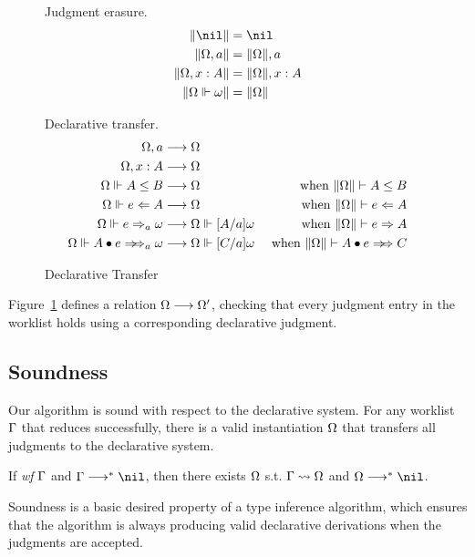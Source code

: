 \begin{figure}[ht]
\hfill \framebox{$\|\Om\|$} \hfill Judgment erasure.
\begin{gather*}
\begin{aligned}
\|\nil\| &= \nil\\
\|\Om,a\| &= \|\Om\|, a\\
\|\Om,x:A\| &= \|\Om\|, x:A\\
\|\Om\Vdash\jg\| &= \|\Om\|
\end{aligned}
\end{gather*}

\hfill {} \hfill Declarative transfer.
\begin{gather*}
\begin{aligned}
\Om,a &\rto \Om \\  \Om,x:A & \rto \Om\\
\Om\Vdash A\le B &\rto \Om &\text{ when } \|\Om\| \vdash A\le B\\
\Om\Vdash e\Lto A &\rto \Om & \text{ when } \|\Om\| \vdash e\Lto A\\
\Om\Vdash e\To_a \jg &\rto \Om\Vdash[A/a]\jg & \text{ when } \|\Om\| \vdash e\To A\\
\Om\Vdash \appInfAlg{A}{e} &\rto \Om\Vdash[C/a]\jg & \text{ when } \|\Om\| \vdash \appInf{A}{e}{C}\\
\end{aligned}
\end{gather*}
\caption{Declarative Transfer}
\label{fig:top:decl:worklist}
\end{figure}

Figure~\ref{fig:top:decl:worklist} defines a relation $\Omega \longrightarrow \Omega'$,
checking that every judgment entry in the worklist
holds using a corresponding declarative judgment.

\subsection{Soundness}

Our algorithm is sound with respect to the declarative system.
For any worklist $\Gamma$ that reduces successfully,
there is a valid instantiation $\Omega$ that transfers all judgments
to the declarative system.
\begin{theorem}[Soundness]
If \emph{wf }$\Gamma$ and $\Gm \redto \nil$,
then there exists $\Omega$ s.t. $\Gamma \rightsquigarrow \Omega$ and $\Om \redto \nil$.
\end{theorem}

Soundness is a basic desired property of a type inference algorithm,
which ensures that the algorithm is always producing
valid declarative derivations when the judgments are accepted.

